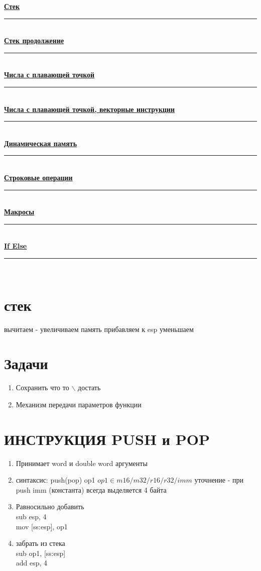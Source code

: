 \documentclass[a4paper, 12pt]{article}
\begin{document}
    \noindent \hyperlink{stack}{\textbf{Стек}} \\
    \noindent\rule{\textwidth}{0.4pt} \\
    \hyperlink{stack_add}{\textbf{Стек продолжение}}\\
    \noindent\rule{\textwidth}{0.4pt} \\
    \hyperlink{floatingnums}{\textbf{Числа с плавающей точкой}}\\
    \noindent\rule{\textwidth}{0.4pt} \\
    \hyperlink{add_floating}{\textbf{Числа с плавающей точкой, векторные инструкции}}\\
    \noindent\rule{\textwidth}{0.4pt} \\
    \hyperlink{dynamic_mem}{\textbf{Динамическая память}}\\
    \noindent\rule{\textwidth}{0.4pt} \\
    \hyperlink{strings_op}{\textbf{Строковые операции}}\\
    \noindent\rule{\textwidth}{0.4pt} \\
    \hyperlink{makros}{\textbf{Макросы}}\\
    \noindent\rule{\textwidth}{0.4pt} \\
    \hyperlink{makros2}{\textbf{If Else}}\\
    \noindent\rule{\textwidth}{0.4pt} \\
    \newpage
    \section*{стек}
    \hypertarget{stack}{}
    вычитаем - увеличиваем память
    прибавляем  к esp уменьшаем
    \section*{Задачи}
    \begin{enumerate}
        \item Сохранить что то $\backslash$ достать
        \item Механизм передачи параметров функции
    \end{enumerate}
    \section*{ИНСТРУКЦИЯ PUSH и POP}
    \begin{enumerate}
        \item Принимает word и double word аргументы
        \item синтаксис: push(pop) op1 $op1 \in m16/m32/r16/r32/imm$ уточнение - при push imm (константа) всегда выделяется 4 байта
        \item Равносильно добавить\\
        sub esp, 4 \\
        mov [ss:esp], op1
        \item забрать из стека \\
        sub op1, [ss:esp] \\
        add esp, 4
    \end{enumerate}
\end{document}
